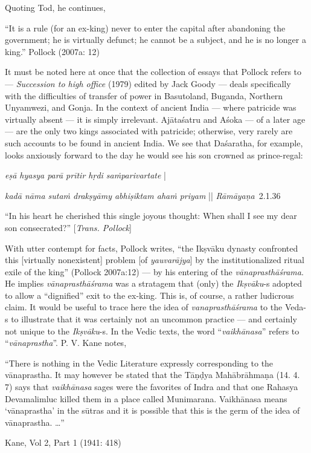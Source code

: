 Quoting Tod, he continues,

\begin{myquote}
“It is a rule (for an ex-king) never to enter the capital after abandoning the government; he is virtually defunct; he cannot be a subject, and he is no longer a king.”
\hfill Pollock (2007a: 12)
\end{myquote}

It must be noted here at once that the collection of essays that Pollock refers to --- {\sl Succession to high office} (1979) edited by Jack Goody --- deals specifically with the difficulties of transfer of power in Basutoland, Buganda, Northern Unyamwezi, and Gonja. In the context of ancient India --- where patricide was virtually absent --- it is simply irrelevant. Ajātaśatru and Aśoka — of a later age — are the only two kings associated with patricide; otherwise, very rarely are such accounts to be found in ancient India. We see that Daśaratha, for example, looks anxiously forward to the day he would see his son crowned as prince-regal:

\begin{myquote}
{{\sl eṣā hyasya parā prītir hṛdi saṁparivartate}} |

{{\sl kadā nāma sutaṁ drakṣyāmy abhiṣiktam ahaṁ priyam}} || {{\sl Rāmāyaṇa}}\relax \ 2.1.36

 “In his heart he cherished this single joyous thought: When shall I see my dear son consecrated?” [{\sl Trans. Pollock}]
\end{myquote}

With utter contempt for facts, Pollock writes, “the Ikṣvāku dynasty confronted this [virtually nonexistent] problem [of {\sl yauvarājya}] by the institutionalized ritual exile of the king” (Pollock 2007a:12) --- by his entering of the {\sl vānaprasthāśrama}. He implies {\sl vānaprasthāśrama} was a stratagem that (only) the {\sl Ikṣvāku}-s adopted to allow a “dignified” exit to the ex-king. This is, of course, a rather ludicrous claim. It would be useful to trace here the idea of {\sl vanaprasthāśrama} to the Veda-s to illustrate that it was certainly not an uncommon practice --- and certainly not unique to the {\sl Ikṣvāku}-s. In the Vedic texts, the word “{\sl vaikhānasa}” refers to “{\sl vānaprastha}”. P. V. Kane notes, 

\begin{myquote}
“There is nothing in the Vedic Literature expressly corresponding to the vānaprastha. It may however be stated that the Tāṇḍya Mahābrāhmaṇa (14. 4. 7) says that {\sl vaikhānasa} sages were the favorites of Indra and that one Rahasya Devamalimluc killed them in a place called Munimarana. Vaikhānasa means ‘vānaprastha’ in the sūtras and it is possible that this is the germ of the idea of vānaprastha. …”

\hfill  Kane, Vol 2, Part 1 (1941: 418)
\end{myquote}

